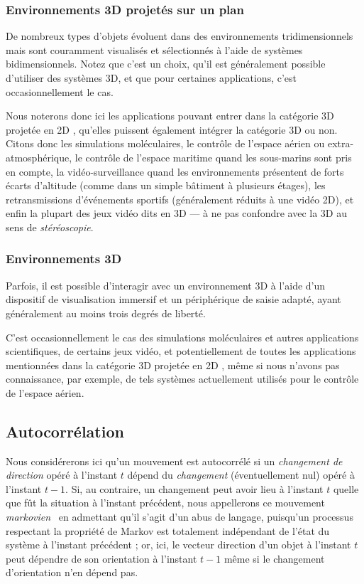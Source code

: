 	\FloatBarrier \subsubsection{Environnements 3D projetés sur un plan}
	De nombreux types d'objets évoluent dans des environnements tridimensionnels mais sont couramment visualisés et sélectionnés à l'aide de systèmes bidimensionnels. Notez que c'est un choix, qu'il est généralement possible d'utiliser des systèmes 3D, et que pour certaines applications, c'est occasionnellement le cas.
	
	Nous noterons donc ici les applications pouvant entrer dans la catégorie \og 3D projetée en 2D \fg{}, qu'elles puissent également intégrer la catégorie 3D ou non. Citons donc les simulations moléculaires, le contrôle de l'espace aérien ou extra-atmosphérique, le contrôle de l'espace maritime quand les sous-marins sont pris en compte, la vidéo-surveillance quand les environnements présentent de forts écarts d'altitude (comme dans un simple bâtiment à plusieurs étages), les retransmissions d'événements sportifs (généralement réduits à une vidéo 2D), et enfin la plupart des jeux vidéo dits \og en 3D \fg{} --- à ne pas confondre avec la 3D au sens de \emph{stéréoscopie}.
	
	\FloatBarrier \subsubsection{Environnements 3D}
	Parfois, il est possible d'interagir avec un environnement 3D à l'aide d'un dispositif de visualisation immersif et un périphérique de saisie adapté, ayant généralement au moins trois degrés de liberté.
	
	C'est occasionnellement le cas des simulations moléculaires et autres applications scientifiques, de certains jeux vidéo, et potentiellement de toutes les applications mentionnées dans la catégorie \og 3D projetée en 2D \fg{}, même si nous n'avons pas connaissance, par exemple, de tels systèmes actuellement utilisés pour le contrôle de l'espace aérien.

	\FloatBarrier \subsection{Autocorrélation}
	Nous considérerons ici qu'un mouvement est autocorrélé si un \emph{changement de direction} opéré à l'instant $t$ dépend du \emph{changement} (éventuellement nul) opéré à l'instant $t-1$. Si, au contraire, un changement peut avoir lieu à l'instant $t$ quelle que fût la situation à l'instant précédent, nous appellerons ce mouvement \emph{markovien}~\cite{markov1960theory} en admettant qu'il s'agit d'un abus de langage, puisqu'un processus respectant la propriété de Markov est totalement indépendant de l'état du système à l'instant précédent ; or, ici, le vecteur direction d'un objet à l'instant $t$ peut dépendre de son orientation à l'instant $t-1$ même si le changement d'orientation n'en dépend pas.
	
